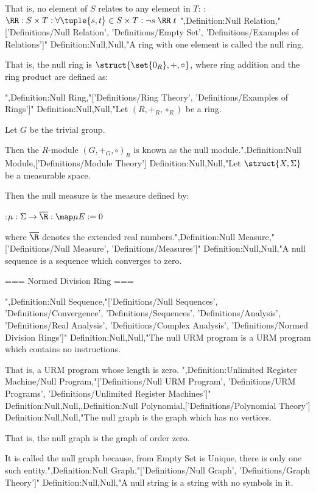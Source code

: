 That is, no element of $S$ relates to any element in $T$:
:$\RR: S \times T: \forall \tuple {s, t} \in S \times T: \neg s \mathrel \RR t$
",Definition:Null Relation,"['Definitions/Null Relation', 'Definitions/Empty Set', 'Definitions/Examples of Relations']"
Definition:Null,Null,"A ring with one element is called the null ring.

That is, the null ring is $\struct {\set {0_R}, +, \circ}$, where ring addition and the ring product are defined as:




",Definition:Null Ring,"['Definitions/Ring Theory', 'Definitions/Examples of Rings']"
Definition:Null,Null,"Let $\left({R, +_R, \circ_R}\right)$ be a ring.

Let $G$ be the trivial group.


Then the $R$-module $\left({G, +_G, \circ}\right)_R$ is known as the null module.",Definition:Null Module,['Definitions/Module Theory']
Definition:Null,Null,"Let $\struct {X, \Sigma}$ be a measurable space.


Then the null measure is the measure defined by:

:$\mu: \Sigma \to \overline \R: \map \mu E := 0$

where $\overline \R$ denotes the extended real numbers.",Definition:Null Measure,"['Definitions/Null Measure', 'Definitions/Measures']"
Definition:Null,Null,"A null sequence is a sequence which converges to zero.


=== Normed Division Ring ===

",Definition:Null Sequence,"['Definitions/Null Sequences', 'Definitions/Convergence', 'Definitions/Sequences', 'Definitions/Analysis', 'Definitions/Real Analysis', 'Definitions/Complex Analysis', 'Definitions/Normed Division Rings']"
Definition:Null,Null,"The null URM program is a URM program which contains no instructions.

That is, a URM program whose length is zero.
",Definition:Unlimited Register Machine/Null Program,"['Definitions/Null URM Program', 'Definitions/URM Programs', 'Definitions/Unlimited Register Machines']"
Definition:Null,Null,,Definition:Null Polynomial,['Definitions/Polynomial Theory']
Definition:Null,Null,"The null graph is the graph which has no vertices.

That is, the null graph is the graph of order zero.


It is called the null graph because, from Empty Set is Unique, there is only one such entity.",Definition:Null Graph,"['Definitions/Null Graph', 'Definitions/Graph Theory']"
Definition:Null,Null,"A null string is a string with no symbols in it.

